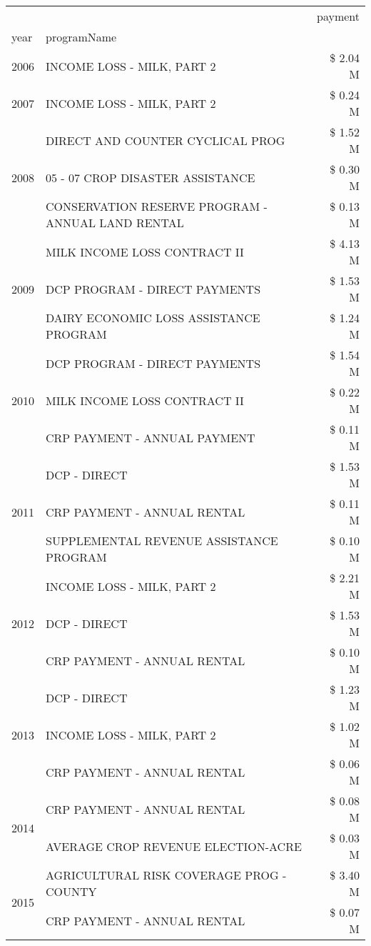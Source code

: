 \begin{tabular}{llr}
\toprule
 &  & payment \\
year & programName &  \\
\midrule
2006 & INCOME LOSS - MILK, PART 2 & \$ 2.04 M \\
\cline{1-3}
2007 & INCOME LOSS - MILK, PART 2 & \$ 0.24 M \\
\cline{1-3}
\multirow[t]{3}{*}{2008} & DIRECT AND COUNTER CYCLICAL PROG & \$ 1.52 M \\
 & 05 - 07 CROP DISASTER ASSISTANCE & \$ 0.30 M \\
 & CONSERVATION RESERVE PROGRAM - ANNUAL LAND RENTAL & \$ 0.13 M \\
\cline{1-3}
\multirow[t]{3}{*}{2009} & MILK INCOME LOSS CONTRACT II & \$ 4.13 M \\
 & DCP PROGRAM - DIRECT PAYMENTS & \$ 1.53 M \\
 & DAIRY ECONOMIC LOSS ASSISTANCE PROGRAM & \$ 1.24 M \\
\cline{1-3}
\multirow[t]{3}{*}{2010} & DCP PROGRAM - DIRECT PAYMENTS & \$ 1.54 M \\
 & MILK INCOME LOSS CONTRACT II & \$ 0.22 M \\
 & CRP PAYMENT - ANNUAL PAYMENT & \$ 0.11 M \\
\cline{1-3}
\multirow[t]{3}{*}{2011} & DCP - DIRECT & \$ 1.53 M \\
 & CRP PAYMENT - ANNUAL RENTAL & \$ 0.11 M \\
 & SUPPLEMENTAL REVENUE ASSISTANCE PROGRAM & \$ 0.10 M \\
\cline{1-3}
\multirow[t]{3}{*}{2012} & INCOME LOSS - MILK, PART 2 & \$ 2.21 M \\
 & DCP - DIRECT & \$ 1.53 M \\
 & CRP PAYMENT - ANNUAL RENTAL & \$ 0.10 M \\
\cline{1-3}
\multirow[t]{3}{*}{2013} & DCP - DIRECT & \$ 1.23 M \\
 & INCOME LOSS - MILK, PART 2 & \$ 1.02 M \\
 & CRP PAYMENT - ANNUAL RENTAL & \$ 0.06 M \\
\cline{1-3}
\multirow[t]{2}{*}{2014} & CRP PAYMENT - ANNUAL RENTAL & \$ 0.08 M \\
 & AVERAGE CROP REVENUE ELECTION-ACRE & \$ 0.03 M \\
\cline{1-3}
\multirow[t]{3}{*}{2015} & AGRICULTURAL RISK COVERAGE PROG - COUNTY & \$ 3.40 M \\
 & CRP PAYMENT - ANNUAL RENTAL & \$ 0.07 M \\

\end{tabular}
